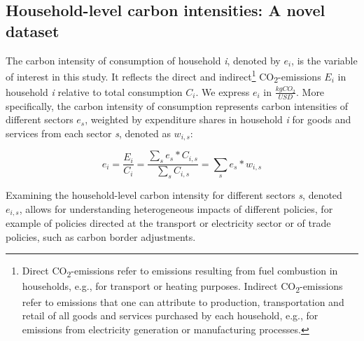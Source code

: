 \documentclass[12pt, a4paper]{article}
\begin{document}
\subsection{Household-level carbon intensities: A novel dataset} \label{sec:data}

The carbon intensity of consumption of household \textit{i}, denoted by $e_{i}$, is the variable of interest in this study. It reflects the direct and indirect\footnote{Direct CO\textsubscript{2}-emissions refer to emissions resulting from fuel combustion in households, e.g., for transport or heating purposes. Indirect CO\textsubscript{2}-emissions refer to emissions that one can attribute to production, transportation and retail of all goods and services purchased by each household, e.g., for emissions from electricity generation or manufacturing processes.} CO\textsubscript{2}-emissions $E_{i}$ in household \textit{i} relative to total consumption $C_{i}$. We express $e_{i}$ in $\frac{kgCO_{2}}{USD}$. More specifically, the carbon intensity of consumption represents carbon intensities of different sectors $e_{s}$, weighted by expenditure shares in household \textit{i} for goods and services from each sector \textit{s}, denoted as $w_{i,s}$:


\begin{equation} \label{eq:ei}
e_{i} = \frac{E_{i}}{C_{i}} = \frac{\sum_{s} e_{s}*C_{i,s}}{\sum_{s} C_{i,s}} = \sum_{s} e_{s}*w_{i,s}
\end{equation}


Examining the household-level carbon intensity for different sectors \textit{s}, denoted $e_{i,s}$, allows for understanding heterogeneous impacts of different policies, for example of policies directed at the transport or electricity sector or of trade policies, such as carbon border adjustments.

\end{document}
